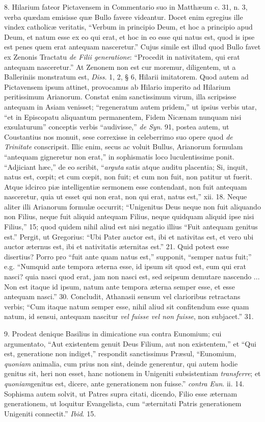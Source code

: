 8. Hilarium
fateor Pictavensem in Commentario suo in Matthæum c. 31, n. 3, verba
quædam emisisse quæ Bullo favere videantur. Docet enim egregius ille
vindex catholicæ veritatis, ``Verbum in principio Deum, et hoc a
principio apud Deum, et natum esse ex eo qui erat, et hoc in eo esse
qui natus est, quod is ipse est penes quem erat antequam nasceretur.''
Cujus simile est illud quod Bullo favet ex Zenonis Tractatu \emph{de
Filii generatione}: ``Procedit in nativitatem, qui erat antequam
nasceretur.'' At Zenonem non est cur moremur, diligentem, ut a
Balleriniis monstratum est, \emph{Diss}. 1, 2, § 6, Hilarii
imitatorem. Quod autem ad Pictavensem ipsum attinet, provocamus ab
Hilario imperito ad Hilarium peritissimum Arianorum. Constat enim
sanctissimum virum, illa scripsisse antequam in Asiam venisset; ``regeneratum autem
pridem,'' ut ipsius verbis utar, ``et in
Episcopatu aliquantum permanentem, Fidem Nicænam nunquam nisi
exsulaturum'' conceptis verbis ``audivisse,'' \emph{de Syn}. 91,
postea autem, ut Coustantius nos monuit, sese correxisse in
celeberrimo suo opere quod \emph{de Trinitate} conscripsit. Illic enim,
secus ac voluit Bullus, Arianorum formulam ``antequam gigneretur non
erat,'' in sophismatis loco luculentissime ponit. ``Adjiciant hæc,''
de eo scribit, ``\emph{arguta} satis atque auditu placentia; Si,
inquit, natus est, cœpit; et cum cœpit, non fuit; et cum non fuit,
non patitur ut fuerit. Atque idcirco piæ intelligentiæ sermonem
esse contendant, non fuit antequam nasceretur, quia ut esset qui non
erat, non qui erat, natus est,'' xii. 18. Neque aliter illi Arianorum
formulæ occurrit; ``Unigenitus Deus neque non fuit aliquando non
Filius, neque fuit aliquid antequam Filius, neque quidquam aliquid
ipse nisi Filius,'' 15; quod quidem nihil aliud est nisi negatio
illius ``Fuit antequam genitus est.'' Pergit, ut Gregorius: ``Ubi
Pater auctor est, ibi et nativitas est, et vero ubi auctor æternus
est, ibi et nativitatis æternitas est.'' 21. Quid potest esse
disertius? Porro pro ``fuit ante quam natus est,'' supponit, ``semper natus
fuit;'' e.g. ``Numquid ante tempora æterna esse, id
ipsum sit quod est, eum qui erat nasci? quia nasci quod erat, jam non
nasci est, sed seipsum demutare nascendo ... Non est itaque id ipsum,
natum ante tempora æterna semper esse, et esse antequam nasci.'' 30.
Concludit, Athanasii sensum vel clarioribus retractans verbis; ``Cum
itaque natum semper esse, nihil aliud sit confitendum esse quam natum,
id sensui, antequam nascitur \emph{vel fuisse vel non fuisse}, non
subjacet.'' 31.

9. Prodeat
denique Basilius in dimicatione sua contra Eunomium; cui argumentato, ``Aut existentem genuit Deus Filium, aut non
existentem,'' et ``Qui est, generatione non indiget,'' respondit sanctissimus
Præsul, ``Eunomium, \emph{quoniam} animalia, cum prius non sint, deinde
generentur, qui autem hodie genitus sit, heri non esset, hanc notionem
in Unigeniti subsistentiam \emph{transferre}; et \emph{quoniam}genitus
est, dicere, ante generationem non fuisse.'' \emph{contra} \emph{Eun}.
ii. 14. Sophisma autem solvit, ut Patres supra citati, dicendo,
Filio esse æternam generationem, ut loquitur Evangelista, cum ``æternitati
Patris generationem Unigeniti connectit.'' \emph{Ibid}. 15.

